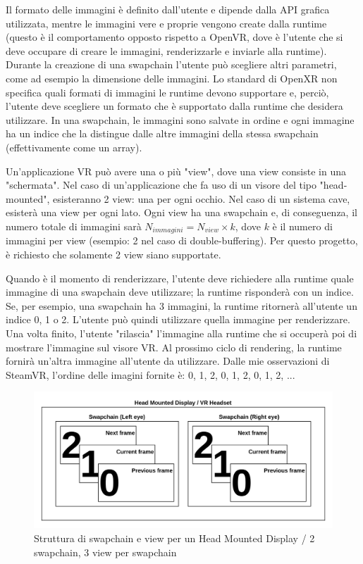 \documentclass[twoside]{supsistudent}
\begin{document}
Il formato delle immagini è definito dall'utente e dipende dalla API grafica utilizzata, mentre le immagini vere e proprie vengono create dalla runtime (questo è il comportamento opposto rispetto a OpenVR, dove è l'utente che si deve occupare di creare le immagini, renderizzarle e inviarle alla runtime). Durante la creazione di una swapchain l'utente può scegliere altri parametri, come ad esempio la dimensione delle immagini. Lo standard di OpenXR non specifica quali formati di immagini le runtime devono supportare e, perciò, l'utente deve scegliere un formato che è supportato dalla runtime che desidera utilizzare. In una swapchain, le immagini sono salvate in ordine e ogni immagine ha un indice che la distingue dalle altre immagini della stessa swapchain (effettivamente come un array).

Un'applicazione VR può avere una o più "view", dove una view consiste in una "schermata". Nel caso di un'applicazione che fa uso di un visore del tipo "head-mounted", esisteranno 2 view: una per ogni occhio. Nel caso di un sistema cave, esisterà una view per ogni lato. Ogni view ha una swapchain e, di conseguenza, il numero totale di immagini sarà $ {N}_{immagini} = {N}_{view} \times k $, dove $ k $ è il numero di immagini per view (esempio: 2 nel caso di double-buffering). Per questo progetto, è richiesto che solamente 2 view siano supportate.

Quando è il momento di renderizzare, l'utente deve richiedere alla runtime quale immagine di una swapchain deve utilizzare; la runtime risponderà con un indice. Se, per esempio, una swapchain ha 3 immagini, la runtime ritornerà all'utente un indice 0, 1 o 2. L'utente può quindi utilizzare quella immagine per renderizzare. Una volta finito, l'utente "rilascia" l'immagine alla runtime che si occuperà poi di mostrare l'immagine sul visore VR. Al prossimo ciclo di rendering, la runtime fornirà un'altra immagine all'utente da utilizzare. Dalle mie osservazioni di SteamVR, l'ordine delle imagini fornite è: 0, 1, 2, 0, 1, 2, 0, 1, 2, ...

\begin{figure}[h]
  \caption{Struttura di swapchain e view per un Head Mounted Display / 2 swapchain, 3 view per swapchain}
  \centering
  \includegraphics[scale=0.3]{resources/swapchains.png}
\end{figure}
\end{document}
